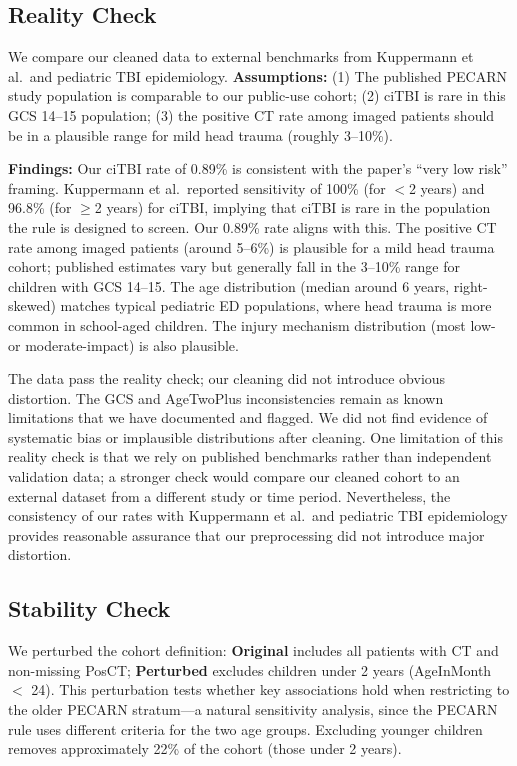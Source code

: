 \documentclass[10pt,letterpaper]{article}
\begin{document}
\subsection{Reality Check}\label{reality-check}

We compare our cleaned data to external benchmarks from Kuppermann et al.\ and pediatric TBI epidemiology. \textbf{Assumptions:} (1) The published PECARN study population is comparable to our public-use cohort; (2) ciTBI is rare in this GCS 14--15 population; (3) the positive CT rate among imaged patients should be in a plausible range for mild head trauma (roughly 3--10\%).

\textbf{Findings:} Our ciTBI rate of 0.89\% is consistent with the paper's ``very low risk'' framing. Kuppermann et al.\ reported sensitivity of 100\% (for $<$2 years) and 96.8\% (for $\ge$2 years) for ciTBI, implying that ciTBI is rare in the population the rule is designed to screen. Our 0.89\% rate aligns with this. The positive CT rate among imaged patients (around 5--6\%) is plausible for a mild head trauma cohort; published estimates vary but generally fall in the 3--10\% range for children with GCS 14--15. The age distribution (median around 6 years, right-skewed) matches typical pediatric ED populations, where head trauma is more common in school-aged children. The injury mechanism distribution (most low- or moderate-impact) is also plausible.

The data pass the reality check; our cleaning did not introduce obvious distortion. The GCS and AgeTwoPlus inconsistencies remain as known limitations that we have documented and flagged. We did not find evidence of systematic bias or implausible distributions after cleaning. One limitation of this reality check is that we rely on published benchmarks rather than independent validation data; a stronger check would compare our cleaned cohort to an external dataset from a different study or time period. Nevertheless, the consistency of our rates with Kuppermann et al.\ and pediatric TBI epidemiology provides reasonable assurance that our preprocessing did not introduce major distortion.

\subsection{Stability Check}\label{stability-check}

We perturbed the cohort definition: \textbf{Original} includes all patients with CT and non-missing PosCT; \textbf{Perturbed} excludes children under 2 years (AgeInMonth $<$ 24). This perturbation tests whether key associations hold when restricting to the older PECARN stratum---a natural sensitivity analysis, since the PECARN rule uses different criteria for the two age groups. Excluding younger children removes approximately 22\% of the cohort (those under 2 years).
\end{document}
